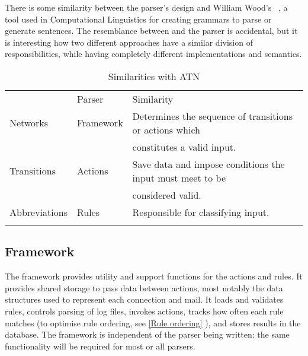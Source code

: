 \documentclass[draft]{svmult}
\newcommand{\refwithpage}[1]{%
    \empty{}\vref{#1}%
}
\newcommand{\sectionref}[1]{%
    \textsection{}\vref*{#1}%
}
\begin{document}
There is some similarity between the parser's design and William Wood's
\ATN{}~\cite{atns, nlpip}, a tool used in Computational Linguistics for
creating grammars to parse or generate sentences.  The resemblance between
\ATN{} and the parser is accidental, but it is interesting how two
different approaches have a similar division of responsibilities, while
having completely different implementations and semantics.


\begin{table}[ht]
    \caption{Similarities with ATN}\label{Similarities with ATN}
    \begin{tabular}[]{lll}
        \hline
        \noalign{\smallskip}
        \ATN{}        & Parser    & Similarity                          \\
        \noalign{\smallskip}
        \hline
        \noalign{\smallskip}
        Networks      & Framework & Determines the sequence of
                                    transitions or actions which        \\
                      &           & constitutes a valid input.          \\
        Transitions   & Actions   & Save data and impose conditions the
                                    input must meet to be               \\
                      &           & considered valid.                   \\
        Abbreviations & Rules     & Responsible for classifying input.  \\
        \noalign{\smallskip}
        \hline
        \noalign{\smallskip}
    \end{tabular}
\end{table}

\subsection{Framework}

\label{Framework}

The framework provides utility and support functions for the actions and
rules.  It provides shared storage to pass data between actions, most
notably the data structures used to represent each connection and mail.  It
loads and validates rules, controls parsing of log files, invokes actions,
tracks how often each rule matches (to optimise rule ordering, see
\sectionref{Rule ordering}), and stores results in the database.  The
framework is independent of the parser being written: the same
functionality will be required for most or all parsers.
\end{document}
